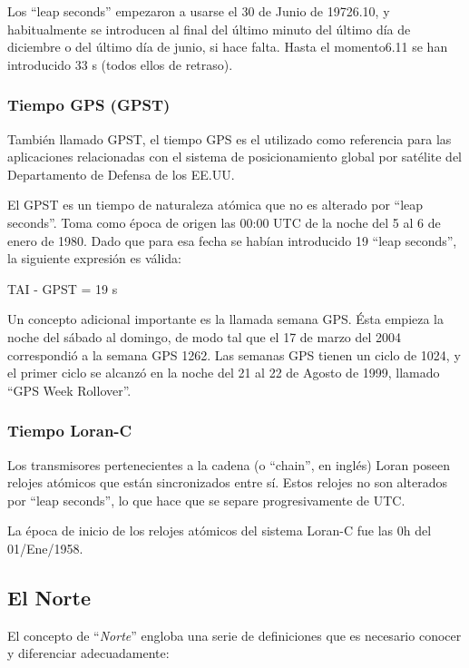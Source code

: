 \documentclass[a4paper,12pt,twoside]{article}
\begin{document}
Los ``leap seconds'' empezaron a usarse el 30 de Junio de 19726.10, y habitualmente se introducen al final del último minuto del último día de diciembre o del último día de junio, si hace falta. Hasta el momento6.11 se han introducido 33 s (todos ellos de retraso).

\subsubsection{Tiempo GPS (GPST)}
\label{sec:tiempo.gps}


También llamado GPST, el tiempo GPS es el utilizado como referencia para las aplicaciones relacionadas con el sistema de posicionamiento global por satélite del Departamento de Defensa de los EE.UU.

El GPST es un tiempo de naturaleza atómica que no es alterado por ``leap seconds''. Toma como época de origen las 00:00 UTC de la noche del 5 al 6 de enero de 1980. Dado que para esa fecha se habían introducido 19 ``leap seconds'', la siguiente expresión es válida:

TAI - GPST = 19 s

Un concepto adicional importante es la llamada semana GPS. Ésta empieza la noche del sábado al domingo, de modo tal que el 17 de marzo del 2004 correspondió a la semana GPS 1262. Las semanas GPS tienen un ciclo de 1024, y el primer ciclo se alcanzó en la noche del 21 al 22 de Agosto de 1999, llamado ``GPS Week Rollover''. 

\subsubsection{Tiempo Loran-C}
\label{sec:tiempo.loran.c}


Los transmisores pertenecientes a la cadena (o ``chain'', en inglés) Loran poseen relojes atómicos que están sincronizados entre sí. Estos relojes no son alterados por ``leap seconds'', lo que hace que se separe progresivamente de UTC.

La época de inicio de los relojes atómicos del sistema Loran-C fue las 0h del 01/Ene/1958.

\subsection{El Norte}
\label{sec:el.norte}
El concepto de ``\emph{Norte}'' engloba una serie de definiciones que es necesario conocer y diferenciar adecuadamente:
\end{document}
